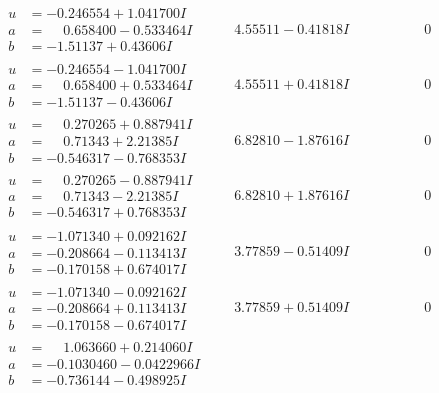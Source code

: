\documentclass[1p]{elsarticle_modified}
\theoremstyle{definition}
\begin{document}
$$\begin{array}{c|c|c}
\begin{aligned}
u &= -0.246554 + 1.041700 I \\
a &= \phantom{-}0.658400 - 0.533464 I \\
b &= -1.51137 + 0.43606 I\end{aligned}
 & \phantom{-}4.55511 - 0.41818 I & \phantom{-0.000000 } 0 \\ \hline\begin{aligned}
u &= -0.246554 - 1.041700 I \\
a &= \phantom{-}0.658400 + 0.533464 I \\
b &= -1.51137 - 0.43606 I\end{aligned}
 & \phantom{-}4.55511 + 0.41818 I & \phantom{-0.000000 } 0 \\ \hline\begin{aligned}
u &= \phantom{-}0.270265 + 0.887941 I \\
a &= \phantom{-}0.71343 + 2.21385 I \\
b &= -0.546317 - 0.768353 I\end{aligned}
 & \phantom{-}6.82810 - 1.87616 I & \phantom{-0.000000 } 0 \\ \hline\begin{aligned}
u &= \phantom{-}0.270265 - 0.887941 I \\
a &= \phantom{-}0.71343 - 2.21385 I \\
b &= -0.546317 + 0.768353 I\end{aligned}
 & \phantom{-}6.82810 + 1.87616 I & \phantom{-0.000000 } 0 \\ \hline\begin{aligned}
u &= -1.071340 + 0.092162 I \\
a &= -0.208664 - 0.113413 I \\
b &= -0.170158 + 0.674017 I\end{aligned}
 & \phantom{-}3.77859 - 0.51409 I & \phantom{-0.000000 } 0 \\ \hline\begin{aligned}
u &= -1.071340 - 0.092162 I \\
a &= -0.208664 + 0.113413 I \\
b &= -0.170158 - 0.674017 I\end{aligned}
 & \phantom{-}3.77859 + 0.51409 I & \phantom{-0.000000 } 0 \\ \hline\begin{aligned}
u &= \phantom{-}1.063660 + 0.214060 I \\
a &= -0.1030460 - 0.0422966 I \\
b &= -0.736144 - 0.498925 I\end{aligned}

\end{array}$$
\end{document}
